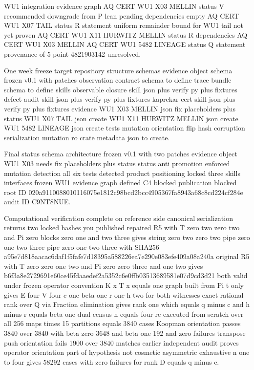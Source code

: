 WU1 integration evidence graph AQ CERT WU1 X03 MELLIN status V recommended downgrade from P lean pending dependencies empty AQ CERT WU1 X07 TAIL status R statement uniform remainder bound for WU1 tail not yet proven AQ CERT WU1 X11 HURWITZ MELLIN status R dependencies AQ CERT WU1 X03 MELLIN AQ CERT WU1 5482 LINEAGE status Q statement provenance of 5 point 4821903142 unresolved.

One week freeze target repository structure schemas evidence object schema frozen v0.1 with patches observation contract schema to define trace bundle schema to define skills observable closure skill json plus verify py plus fixtures defect audit skill json plus verify py plus fixtures kaprekar cert skill json plus verify py plus fixtures evidence WU1 X03 MELLIN json fix placeholders plus status WU1 X07 TAIL json create WU1 X11 HURWITZ MELLIN json create WU1 5482 LINEAGE json create tests mutation orientation flip hash corruption serialization mutation ro crate metadata json to create.

Final status schema architecture frozen v0.1 with two patches evidence object WU1 X03 needs fix placeholders plus status status anti promotion enforced mutation detection all six tests detected product positioning locked three skills interfaces frozen WU1 evidence graph defined C4 blocked publication blocked root ID 020a9110088010116075e1812c98bcd2bcc4905367fa8943a68c8cd224cf284e audit ID C9NT8NUE.

Computational verification complete on reference side canonical serialization returns two locked hashes you published repaired R5 with T zero two zero two and Pi zero blocks zero one and two three gives string zero two zero two pipe zero one two three pipe zero one two three with SHA256 a95e7d818aacac6daf1f5fafe7d18395a588226ea7e290e083efe409a08a240a original R5 with T zero zero one two and Pi zero zero three and one two gives b6f3a8e2729691e60ce45fdaaedef2a5352c6e0ffb03513689581e07d9cd3d21 both valid under frozen operator convention K x T x equals one graph built from Pi t only gives E four V four c one beta one r one h two for both witnesses exact rational rank over Q via Fraction elimination gives rank one which equals q minus c and h minus r equals beta one dual census n equals four re executed from scratch over all 256 maps times 15 partitions equals 3840 cases Koopman orientation passes 3840 over 3840 with beta zero 3648 and beta one 192 and zero failures transpose push orientation fails 1900 over 3840 matches earlier independent audit proves operator orientation part of hypothesis not cosmetic asymmetric exhaustive n one to four gives 58292 cases with zero failures for rank D equals q minus c.

